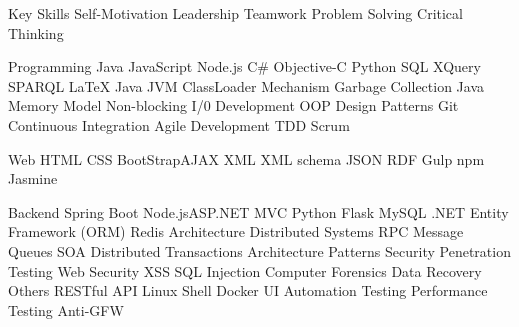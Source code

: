 

\begin{cvskills}

  \cvskill
    {Key Skills} %
    {Self-Motivation \quad Leadership \quad Teamwork \quad Problem Solving \quad Critical Thinking} %
    
  \cvskill
    {Programming} %
    {Java \quad JavaScript \quad Node.js \quad C\# \quad Objective-C   \quad Python \quad SQL \quad XQuery  \quad SPARQL \quad LaTeX} %
      \cvskill
    {Java} %
    {JVM \quad ClassLoader Mechanism \quad Garbage Collection \quad Java Memory Model  \quad Non-blocking I/0} %
  \cvskill
    {Development} %
    {OOP \quad Design Patterns \quad Git \quad Continuous Integration \quad Agile Development \quad TDD \quad Scrum} %

  \cvskill
    {Web} %
    {HTML \quad CSS \quad BootStrap\quad AJAX \quad XML \quad XML schema \quad JSON \quad   RDF  \quad Gulp \quad npm \quad Jasmine} %

   \cvskill
    {Backend} %
    {Spring Boot \quad Node.js\quad ASP.NET MVC \quad Python Flask  \quad MySQL \quad  .NET Entity Framework (ORM) \quad  Redis} %
 \cvskill
    {Architecture} %
    {Distributed Systems \quad RPC \quad Message Queues \quad SOA \quad Distributed Transactions  \quad Architecture Patterns   } %
 \cvskill
{Security} %
{Penetration Testing \quad Web Security \quad XSS \quad SQL Injection \quad Computer Forensics \quad Data Recovery   } %
 \cvskill
    {Others} %
    {RESTful API \quad Linux \quad Shell \quad Docker \quad UI Automation Testing \quad Performance Testing  \quad Anti-GFW } %
\end{cvskills}
